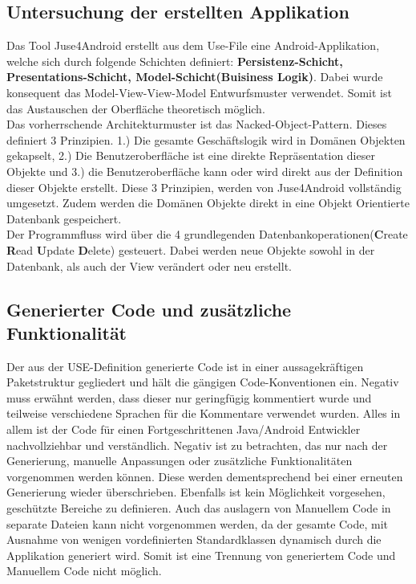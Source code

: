 \documentclass[a4paper,twoside]{article}
\begin{document}
\subsection{Untersuchung der erstellten Applikation}
Das Tool Juse4Android erstellt aus dem Use-File eine Android-Applikation, welche sich durch folgende Schichten definiert: \textbf{Persistenz-Schicht, Presentations-Schicht, Model-Schicht(Buisiness Logik)}. Dabei wurde konsequent das Model-View-View-Model Entwurfsmuster verwendet. Somit ist das Austauschen der Oberfläche theoretisch möglich.\\
Das vorherrschende Architekturmuster ist das Nacked-Object-Pattern. Dieses definiert 3 Prinzipien. 1.) Die gesamte Geschäftslogik wird in Domänen Objekten gekapselt, 2.) Die Benutzeroberfläche ist eine direkte Repräsentation dieser Objekte und 3.) die Benutzeroberfläche kann oder wird direkt aus der Definition dieser Objekte erstellt. Diese 3 Prinzipien, werden von Juse4Android vollständig umgesetzt. Zudem werden die Domänen Objekte direkt in eine Objekt Orientierte Datenbank gespeichert.\\
Der Programmfluss wird über die 4 grundlegenden Datenbankoperationen(\textbf{C}reate \textbf{R}ead \textbf{U}pdate \textbf{D}elete) gesteuert. Dabei werden neue Objekte sowohl in der Datenbank, als auch der View verändert oder neu erstellt.\\

\subsection{Generierter Code und zusätzliche Funktionalität}
Der aus der USE-Definition generierte Code ist in einer aussagekräftigen Paketstruktur gegliedert und hält die gängigen Code-Konventionen ein. Negativ muss erwähnt werden, dass dieser nur geringfügig kommentiert wurde und teilweise verschiedene Sprachen für die Kommentare verwendet wurden. Alles in allem ist der Code für einen Fortgeschrittenen Java/Android Entwickler nachvollziehbar und verständlich. Negativ ist zu betrachten, das nur nach der Generierung, manuelle Anpassungen oder zusätzliche Funktionalitäten vorgenommen werden können. Diese werden dementsprechend bei einer erneuten Generierung wieder überschrieben. Ebenfalls ist kein Möglichkeit vorgesehen, geschützte Bereiche zu definieren. Auch das auslagern von Manuellem Code in separate Dateien kann nicht vorgenommen werden, da der gesamte Code, mit Ausnahme von wenigen vordefinierten Standardklassen dynamisch durch die Applikation generiert wird. Somit ist eine Trennung von generiertem Code und Manuellem Code nicht möglich. 
\end{document}
